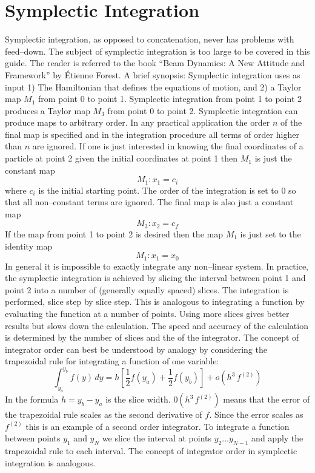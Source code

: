 \section{Symplectic Integration}
\label{s:symp.integ}

Symplectic integration, as opposed to concatenation, never has
problems with feed--down. The subject of symplectic integration is too
large to be covered in this guide. The reader is referred to the book
``Beam Dynamics: A New Attitude and Framework'' by \'Etienne
Forest\cite{b:forest}. A brief synopsis: Symplectic integration uses
as input 1) The Hamiltonian that defines the equations of motion, and
2) a Taylor map $M_1$ from point 0 to point 1. Symplectic integration
from point 1 to point 2 produces a Taylor map $M_3$ from point 0 to
point 2. Symplectic integration can produce maps to arbitrary
order. In any practical application the order $n$ of the final map is
specified and in the integration procedure all terms of order higher
than $n$ are ignored. If one is just interested in knowing the final
coordinates of a particle at point 2 given the initial coordinates at
point 1 then $M_1$ is just the constant map
\begin{equation}
  M_1: x_1 = c_i
\end{equation}
where $c_i$ is the initial starting point. The order of the integration is set to 0 so that all
non--constant terms are ignored. The final map is also just a constant map
\begin{equation}
  M_3: x_2 = c_f
\end{equation}
If the map from point 1 to point 2 is desired then the map $M_1$ is just set to the identity map
\begin{equation}
  M_1: x_1 = x_0
\end{equation}
In general it is impossible to exactly integrate any non--linear system. In practice, the symplectic
integration is achieved by slicing the interval between point 1 and point 2 into a number of
(generally equally spaced) slices. The integration is performed, slice step by slice step. This is
analogous to integrating a function by evaluating the function at a number of points. Using more
slices gives better results but slows down the calculation. The speed and accuracy of the
calculation is determined by the number of slices and the  of the integrator. The concept
of integrator order can best be understood by analogy by considering the trapezoidal rule for
integrating a function of one variable:
\begin{equation}
  \int_{y_a}^{y_b} f(y) \, dy = 
  h \left[ \frac{1}{2} f(y_a) + \frac{1}{2} f(y_b) \right] +
  o(h^3 \, f^{(2)})
\end{equation}
In the formula $h = y_b - y_a$ is the slice width. $0(h^3 \, f^{(2)})$ means that the error of the
trapezoidal rule scales as the second derivative of $f$. Since the error scales as $f^{(2)}$ this is
an example of a second order integrator. To integrate a function between points $y_1$ and $y_N$ we
slice the interval at points $y_2 \ldots y_{N-1}$ and apply the trapezoidal rule to each
interval. The concept of integrator order in symplectic integration is analogous.

